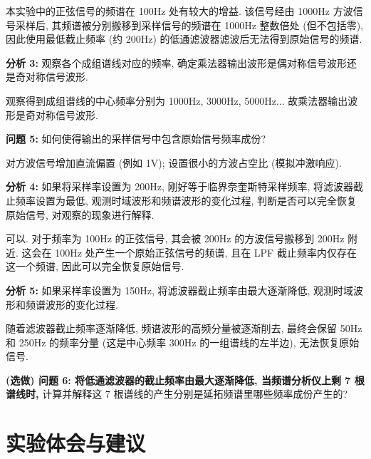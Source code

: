 \documentclass{dspreport}
\begin{document}
\begin{block}
    本实验中的正弦信号的频谱在 100Hz 处有较大的增益. 该信号经由 1000Hz 方波信号采样后, 其频谱被分别搬移到采样信号的频谱在 1000Hz 整数倍处 (但不包括零), 因此使用最低截止频率 (约 200Hz) 的低通滤波器滤波后无法得到原始信号的频谱.
\end{block}

\textbf{分析 3:} 观察各个成组谱线对应的频率, 确定乘法器输出波形是偶对称信号波形还是奇对称信号波形.

\begin{block}
    观察得到成组谱线的中心频率分别为 1000Hz, 3000Hz, 5000Hz... 故乘法器输出波形是奇对称信号波形.
\end{block}

\textbf{问题 5:} 如何使得输出的采样信号中包含原始信号频率成份?

\begin{block}
    对方波信号增加直流偏置 (例如 1V); 设置很小的方波占空比 (模拟冲激响应).
\end{block}

\textbf{分析 4:} 如果将采样率设置为 200Hz, 刚好等于临界奈奎斯特采样频率, 将滤波器截止频率设置为最低, 观测时域波形和频谱波形的变化过程, 判断是否可以完全恢复原始信号, 对观察的现象进行解释.

\begin{block}
    可以. 对于频率为 100Hz 的正弦信号, 其会被 200Hz 的方波信号搬移到 200Hz 附近. 这会在 100Hz 处产生一个原始正弦信号的频谱, 且在 LPF 截止频率内仅存在这一个频谱, 因此可以完全恢复原始信号.
\end{block}

\textbf{分析 5:} 如果采样率设置为 150Hz, 将滤波器截止频率由最大逐渐降低, 观测时域波形和频谱波形的变化过程.

\begin{block}
    随着滤波器截止频率逐渐降低, 频谱波形的高频分量被逐渐削去, 最终会保留 50Hz 和 250Hz 的频率分量 (这是中心频率 300Hz 的一组谱线的左半边), 无法恢复原始信号.
\end{block}

\textbf{(选做) 问题 6: 将低通滤波器的截止频率由最大逐渐降低, 当频谱分析仪上剩 7 根谱线时,} 计算并解释这 7 根谱线的产生分别是延拓频谱里哪些频率成份产生的?

\begin{block}

\end{block}

\section{实验体会与建议}
\begin{block}

\end{block}
\end{document}
